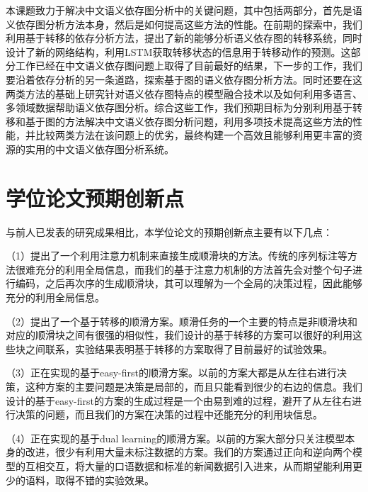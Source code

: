本课题致力于解决中文语义依存图分析中的关键问题，其中包括两部分，首先是语义依存图分析方法本身，然后是如何提高这些方法的性能。在前期的探索中，我们利用基于转移的依存分析方法，提出了新的能够分析语义依存图的转移系统，同时设计了新的网络结构，利用LSTM获取转移状态的信息用于转移动作的预测。这部分工作已经在中文语义依存图问题上取得了目前最好的结果，下一步的工作，我们要沿着依存分析的另一条道路，探索基于图的语义依存图分析方法。同时还要在这两类方法的基础上研究针对语义依存图特点的模型融合技术以及如何利用多语言、多领域数据帮助语义依存图分析。综合这些工作，我们预期目标为分别利用基于转移和基于图的方法解决中文语义依存图分析问题，利用多项技术提高这些方法的性能，并比较两类方法在该问题上的优劣，最终构建一个高效且能够利用更丰富的资源的实用的中文语义依存图分析系统。

\section{学位论文预期创新点}
与前人已发表的研究成果相比，本学位论文的预期创新点主要有以下几点：

（1）提出了一个利用注意力机制来直接生成顺滑块的方法。传统的序列标注等方法很难充分的利用全局信息，而我们的基于注意力机制的方法首先会对整个句子进行编码，之后再次序的生成顺滑块，其可以理解为一个全局的决策过程，因此能够充分的利用全局信息。

（2）提出了一个基于转移的顺滑方案。顺滑任务的一个主要的特点是非顺滑块和对应的顺滑块之间有很强的相似性，我们设计的基于转移的方案可以很好的利用这些块之间联系，实验结果表明基于转移的方案取得了目前最好的试验效果。

（3）正在实现的基于easy-first的顺滑方案。以前的方案大都是从左往右进行决策，这种方案的主要问题是决策是局部的，而且只能看到很少的右边的信息。我们设计的基于easy-first的方案的生成过程是一个由易到难的过程，避开了从左往右进行决策的问题，而且我们的方案在决策的过程中还能充分的利用块信息。

（4）正在实现的基于dual learning的顺滑方案。以前的方案大部分只关注模型本身的改进，很少有利用大量未标注数据的方案。我们的方案通过正向和逆向两个模型的互相交互，将大量的口语数据和标准的新闻数据引入进来，从而期望能利用更少的语料，取得不错的实验效果。


